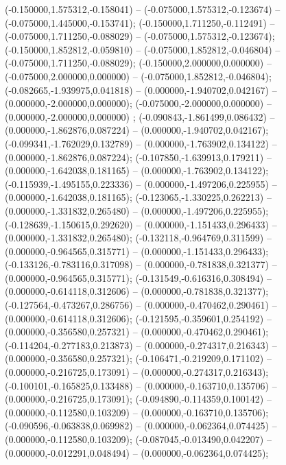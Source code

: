 (-0.150000,1.575312,-0.158041) -- (-0.075000,1.575312,-0.123674) -- (-0.075000,1.445000,-0.153741);
 (-0.150000,1.711250,-0.112491) -- (-0.075000,1.711250,-0.088029) -- (-0.075000,1.575312,-0.123674);
 (-0.150000,1.852812,-0.059810) -- (-0.075000,1.852812,-0.046804) -- (-0.075000,1.711250,-0.088029);
 (-0.150000,2.000000,0.000000) -- (-0.075000,2.000000,0.000000) -- (-0.075000,1.852812,-0.046804);
 (-0.082665,-1.939975,0.041818) -- (0.000000,-1.940702,0.042167) -- (0.000000,-2.000000,0.000000);
 (-0.075000,-2.000000,0.000000) -- (0.000000,-2.000000,0.000000) ;
 (-0.090843,-1.861499,0.086432) -- (0.000000,-1.862876,0.087224) -- (0.000000,-1.940702,0.042167);
 (-0.099341,-1.762029,0.132789) -- (0.000000,-1.763902,0.134122) -- (0.000000,-1.862876,0.087224);
 (-0.107850,-1.639913,0.179211) -- (0.000000,-1.642038,0.181165) -- (0.000000,-1.763902,0.134122);
 (-0.115939,-1.495155,0.223336) -- (0.000000,-1.497206,0.225955) -- (0.000000,-1.642038,0.181165);
 (-0.123065,-1.330225,0.262213) -- (0.000000,-1.331832,0.265480) -- (0.000000,-1.497206,0.225955);
 (-0.128639,-1.150615,0.292620) -- (0.000000,-1.151433,0.296433) -- (0.000000,-1.331832,0.265480);
 (-0.132118,-0.964769,0.311599) -- (0.000000,-0.964565,0.315771) -- (0.000000,-1.151433,0.296433);
 (-0.133126,-0.783116,0.317098) -- (0.000000,-0.781838,0.321377) -- (0.000000,-0.964565,0.315771);
 (-0.131549,-0.616316,0.308494) -- (0.000000,-0.614118,0.312606) -- (0.000000,-0.781838,0.321377);
 (-0.127564,-0.473267,0.286756) -- (0.000000,-0.470462,0.290461) -- (0.000000,-0.614118,0.312606);
 (-0.121595,-0.359601,0.254192) -- (0.000000,-0.356580,0.257321) -- (0.000000,-0.470462,0.290461);
 (-0.114204,-0.277183,0.213873) -- (0.000000,-0.274317,0.216343) -- (0.000000,-0.356580,0.257321);
 (-0.106471,-0.219209,0.171102) -- (0.000000,-0.216725,0.173091) -- (0.000000,-0.274317,0.216343);
 (-0.100101,-0.165825,0.133488) -- (0.000000,-0.163710,0.135706) -- (0.000000,-0.216725,0.173091);
 (-0.094890,-0.114359,0.100142) -- (0.000000,-0.112580,0.103209) -- (0.000000,-0.163710,0.135706);
 (-0.090596,-0.063838,0.069982) -- (0.000000,-0.062364,0.074425) -- (0.000000,-0.112580,0.103209);
 (-0.087045,-0.013490,0.042207) -- (0.000000,-0.012291,0.048494) -- (0.000000,-0.062364,0.074425);
